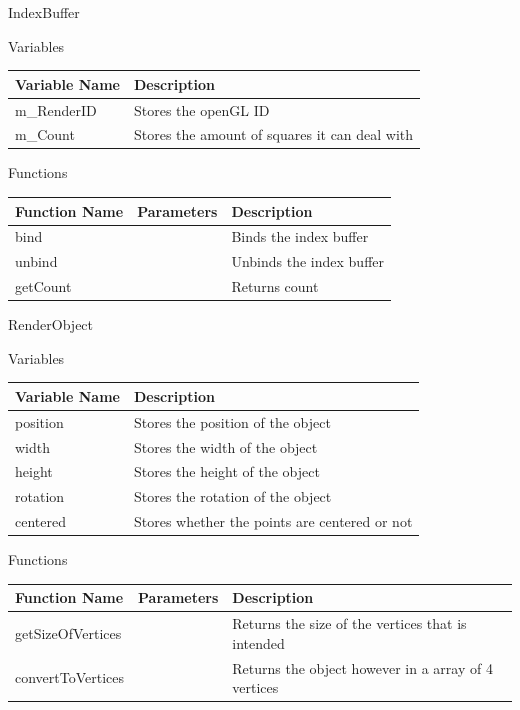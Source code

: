 \documentclass[../../Main.tex]{subfiles}
\begin{document}
    IndexBuffer
    \begin{center}
        Variables
        \begin{tabular}{ | m{} | m{} | }
            \hline
            \textbf{Variable Name} & \textbf{Description} \\
            \hline
            m\_RenderID & Stores the openGL ID \\
            \hline
            m\_Count & Stores the amount of squares it can deal with \\
            \hline
        \end{tabular}
        Functions
        \begin{tabular}{ | m{} | m{}| m{} | }
            \hline
            \textbf{Function Name} & \textbf{Parameters} & \textbf{Description} \\
            \hline
            bind & & Binds the index buffer \\
            \hline
            unbind & & Unbinds the index buffer \\
            \hline
            getCount & & Returns count \\
            \hline
        \end{tabular}
    \end{center}
    RenderObject
    \begin{center}
        Variables
        \begin{tabular}{ | m{} | m{} | }
            \hline
            \textbf{Variable Name} & \textbf{Description} \\
            \hline
            position & Stores the position of the object \\
            \hline
            width & Stores the width of the object \\
            \hline
            height & Stores the height of the object \\
            \hline
            rotation & Stores the rotation of the object \\
            \hline
            centered & Stores whether the points are centered or not \\
            \hline
        \end{tabular}
        Functions
        \begin{tabular}{ | m{} | m{}| m{} | }
            \hline
            \textbf{Function Name} & \textbf{Parameters} & \textbf{Description} \\
            \hline
            getSizeOfVertices & & Returns the size of the vertices that is intended \\
            \hline
            convertToVertices & & Returns the object however in a array of 4 vertices \\
            \hline
        \end{tabular}
    \end{center}
\end{document}
